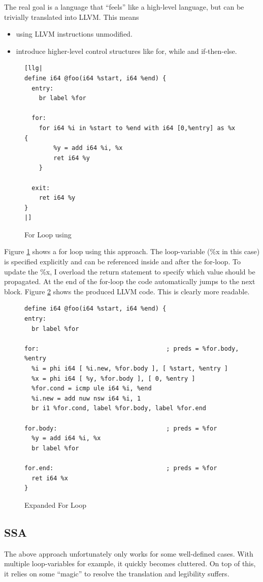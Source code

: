 \documentclass[a4paper,bibliography=totocnumbered,parskip,headsepline]{scrbook}
\begin{document}
The real goal is a language that ``feels'' like a high-level language, but can be trivially translated into LLVM.
This means
\begin{itemize}
 \item using LLVM instructions unmodified.
 \item introduce higher-level control structures like for, while and if-then-else.
\end{itemize}

\begin{figure}
\begin{lstlisting}
[llg|
define i64 @foo(i64 %start, i64 %end) {
  entry:
    br label %for

  for:
    for i64 %i in %start to %end with i64 [0,%entry] as %x {
        %y = add i64 %i, %x
        ret i64 %y
    }

  exit:
    ret i64 %y
}
|]
\end{lstlisting}
\caption{For Loop using }
\label{fig:forquote}
\end{figure}

Figure \ref{fig:forquote} shows a for loop using this approach.
The loop-variable (\%x in this case) is specified explicitly and can be referenced inside and after the for-loop.
To update the \%x, I overload the return statement to specify which value should be propagated.
At the end of the for-loop the code automatically jumps to the next block.
Figure \ref{fig:forquote1} shows the produced LLVM code.
This is clearly more readable.

\begin{figure}
\begin{lstlisting}
define i64 @foo(i64 %start, i64 %end) {
entry:
  br label %for

for:                                   ; preds = %for.body, %entry
  %i = phi i64 [ %i.new, %for.body ], [ %start, %entry ]
  %x = phi i64 [ %y, %for.body ], [ 0, %entry ]
  %for.cond = icmp ule i64 %i, %end
  %i.new = add nuw nsw i64 %i, 1
  br i1 %for.cond, label %for.body, label %for.end

for.body:                              ; preds = %for
  %y = add i64 %i, %x
  br label %for

for.end:                               ; preds = %for
  ret i64 %x
}
\end{lstlisting}
\caption{Expanded For Loop}
\label{fig:forquote1}
\end{figure}

\subsection{SSA}
The above approach unfortunately only works for some well-defined cases.
With multiple loop-variables for example, it quickly becomes cluttered.
On top of this, it relies on some ``magic'' to resolve the translation and legibility suffers.
\end{document}
